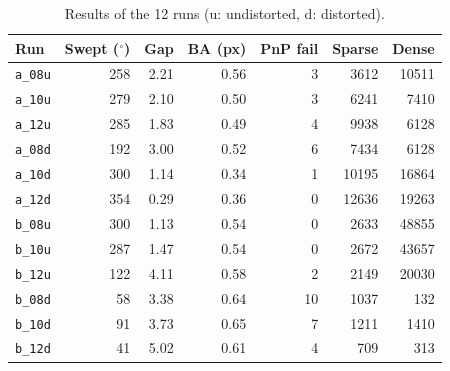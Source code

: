 \begin{table}[t]
\caption{Results of the 12 runs (u: undistorted, d: distorted).}
\label{tab:results}
\centering\scriptsize\setlength{\tabcolsep}{3pt}
\begin{tabular}{lrrrrrr}
\hline
Run & Swept ($^\circ$) & Gap & BA (px) & PnP fail & Sparse & Dense \\
\hline
\texttt{a\_08u} & 258 & 2.21 & 0.56 & 3 & 3612 & 10511 \\
\texttt{a\_10u} & 279 & 2.10 & 0.50 & 3 & 6241 & 7410 \\
\texttt{a\_12u} & 285 & 1.83 & 0.49 & 4 & 9938 & 6128 \\
\texttt{a\_08d} & 192 & 3.00 & 0.52 & 6 & 7434 & 6128 \\
\texttt{a\_10d} & 300 & 1.14 & 0.34 & 1 & 10195 & 16864 \\
\texttt{a\_12d} & 354 & 0.29 & 0.36 & 0 & 12636 & 19263 \\
\texttt{b\_08u} & 300 & 1.13 & 0.54 & 0 & 2633 & 48855 \\
\texttt{b\_10u} & 287 & 1.47 & 0.54 & 0 & 2672 & 43657 \\
\texttt{b\_12u} & 122 & 4.11 & 0.58 & 2 & 2149 & 20030 \\
\texttt{b\_08d} & 58 & 3.38 & 0.64 & 10 & 1037 & 132 \\
\texttt{b\_10d} & 91 & 3.73 & 0.65 & 7 & 1211 & 1410 \\
\texttt{b\_12d} & 41 & 5.02 & 0.61 & 4 & 709 & 313 \\
\hline
\end{tabular}
\end{table}
